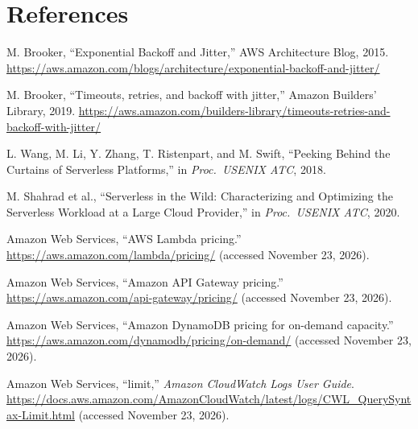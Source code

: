 \documentclass[10pt]{article}
\begin{document}
\section*{References}
\begin{enumerate}[label={[\arabic*]}, ref=\arabic*, leftmargin=*, itemsep=2pt]
  \item\label{ref:brooker2015} M. Brooker, ``Exponential Backoff and Jitter,''
  AWS Architecture Blog, 2015.
  \url{https://aws.amazon.com/blogs/architecture/exponential-backoff-and-jitter/}
  \item\label{ref:brooker2019} M. Brooker, ``Timeouts, retries, and backoff
  with jitter,'' Amazon Builders' Library, 2019.
  \url{https://aws.amazon.com/builders-library/timeouts-retries-and-backoff-with-jitter/}
  \item\label{ref:wang2018} L. Wang, M. Li, Y. Zhang, T. Ristenpart, and
  M. Swift, ``Peeking Behind the Curtains of Serverless Platforms,'' in
  \emph{Proc.\ USENIX ATC}, 2018.
  \item\label{ref:shahrad2020} M. Shahrad et al., ``Serverless in the Wild:
  Characterizing and Optimizing the Serverless Workload at a Large Cloud
  Provider,'' in \emph{Proc.\ USENIX ATC}, 2020.
  \item\label{ref:lambda-price} Amazon Web Services, ``AWS Lambda pricing.''
  \url{https://aws.amazon.com/lambda/pricing/} (accessed November 23, 2026).
  \item\label{ref:apigw-price} Amazon Web Services, ``Amazon API Gateway
  pricing.'' \url{https://aws.amazon.com/api-gateway/pricing/} (accessed
  November 23, 2026).
  \item\label{ref:ddb-price} Amazon Web Services, ``Amazon DynamoDB pricing for
  on-demand capacity.'' \url{https://aws.amazon.com/dynamodb/pricing/on-demand/}
  (accessed November 23, 2026).
  \item\label{ref:insights} Amazon Web Services, ``limit,'' \emph{Amazon
  CloudWatch Logs User Guide}.
  \url{https://docs.aws.amazon.com/AmazonCloudWatch/latest/logs/CWL_QuerySyntax-Limit.html}
  (accessed November 23, 2026).
\end{enumerate}
\end{document}

